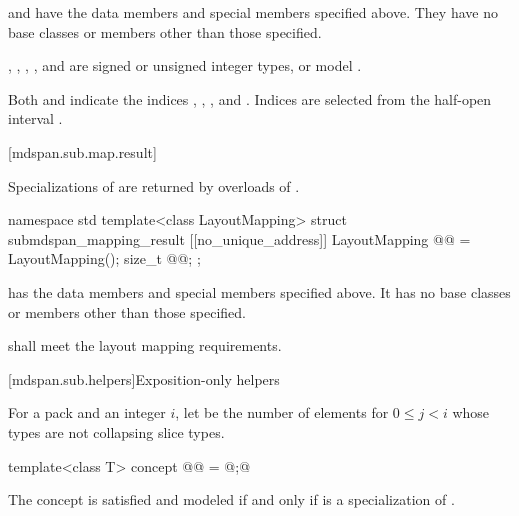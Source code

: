 \pnum
{} and 
have the data members and special members specified above.
They have no base classes or members other than those specified.

\pnum
\mandates
{}, ,
, , and 
are signed or unsigned integer types, or
model .
\begin{note}
Both  and
indicate the indices , , , and .
Indices are selected from the half-open interval .
\end{note}

[mdspan.sub.map.result]{}

\pnum
Specializations of 
are returned by overloads of .

%
\begin{codeblock}
namespace std {
  template<class LayoutMapping>
  struct submdspan_mapping_result {
    [[no_unique_address]] LayoutMapping @@ = LayoutMapping();
    size_t @@{};
  };
}
\end{codeblock}

\pnum
{} has
the data members and special members specified above.
It has no base classes or members other than those specified.

\pnum
{} shall meet
the layout mapping requirements.

[mdspan.sub.helpers]{Exposition-only helpers}

\pnum
{}%
For a pack  and an integer $i$,
let  be the number of elements 
for $0 \le j < i$ whose types are not collapsing slice types.

\begin{itemdecl}
template<class T>
  concept @@ = @\seebelow;@
\end{itemdecl}

\begin{itemdescr}
\pnum
The concept 
is satisfied and modeled if and only
if  is a specialization of .
\end{itemdescr}

